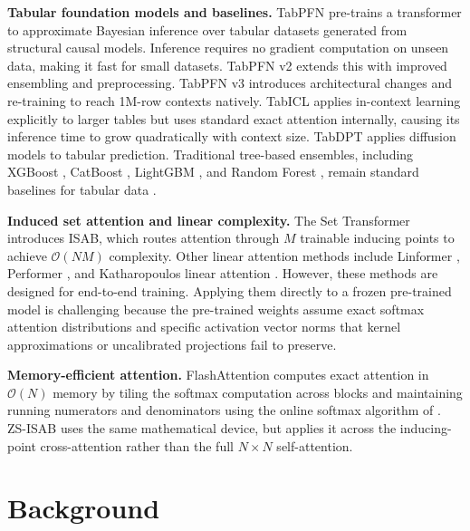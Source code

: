 \documentclass[10pt]{article}
\begin{document}
\textbf{Tabular foundation models and baselines.}
TabPFN \citep{hollmann2022tabpfn} pre-trains a transformer to approximate Bayesian inference over tabular datasets generated from structural causal models. Inference requires no gradient computation on unseen data, making it fast for small datasets. TabPFN v2 \citep{hollmann2025tabpfn2} extends this with improved ensembling and preprocessing. TabPFN v3 \citep{hollmann2025tabpfn3} introduces architectural changes and re-training to reach 1M-row contexts natively. TabICL \citep{huang2024tabicl} applies in-context learning explicitly to larger tables but uses standard exact attention internally, causing its inference time to grow quadratically with context size. TabDPT \citep{ma2024tabdpt} applies diffusion models to tabular prediction. Traditional tree-based ensembles, including XGBoost \citep{chen2016xgboost}, CatBoost \citep{prokhorenkova2018catboost}, LightGBM \citep{ke2017lightgbm}, and Random Forest \citep{breiman2001random}, remain standard baselines for tabular data \citep{grinsztajn2022tree}.

\textbf{Induced set attention and linear complexity.}
The Set Transformer \citep{lee2019set} introduces ISAB, which routes attention through $M$ trainable inducing points to achieve $\mathcal{O}(NM)$ complexity. Other linear attention methods include Linformer \citep{wang2020linformer}, Performer \citep{choromanski2020rethinking}, and Katharopoulos linear attention \citep{katharopoulos2020transformers}. However, these methods are designed for end-to-end training. Applying them directly to a frozen pre-trained model is challenging because the pre-trained weights assume exact softmax attention distributions and specific activation vector norms that kernel approximations or uncalibrated projections fail to preserve.

\textbf{Memory-efficient attention.}
FlashAttention \citep{dao2022flashattention} computes exact attention in $\mathcal{O}(N)$ memory by tiling the softmax computation across blocks and maintaining running numerators and denominators using the online softmax algorithm of \citet{milakov2018online}. ZS-ISAB uses the same mathematical device, but applies it across the inducing-point cross-attention rather than the full $N \times N$ self-attention.

\section{Background}
\end{document}
